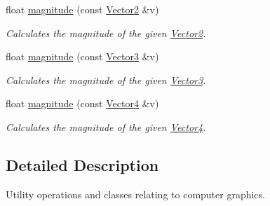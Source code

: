 \begin{DoxyCompactItemize}
\item 
\hypertarget{namespacechaos_1_1gfx_a9ba43b8cdaa6b28dfeb2c7ed6036a54b}{float \hyperlink{namespacechaos_1_1gfx_a9ba43b8cdaa6b28dfeb2c7ed6036a54b}{magnitude} (const \hyperlink{classchaos_1_1gfx_1_1_vector2}{Vector2} \&v)}\label{namespacechaos_1_1gfx_a9ba43b8cdaa6b28dfeb2c7ed6036a54b}

\begin{DoxyCompactList}\small\item\em Calculates the magnitude of the given \hyperlink{classchaos_1_1gfx_1_1_vector2}{Vector2}. \end{DoxyCompactList}\item 
\hypertarget{namespacechaos_1_1gfx_afb2d655cd9f5cd51f31f8126112689aa}{float \hyperlink{namespacechaos_1_1gfx_afb2d655cd9f5cd51f31f8126112689aa}{magnitude} (const \hyperlink{classchaos_1_1gfx_1_1_vector3}{Vector3} \&v)}\label{namespacechaos_1_1gfx_afb2d655cd9f5cd51f31f8126112689aa}

\begin{DoxyCompactList}\small\item\em Calculates the magnitude of the given \hyperlink{classchaos_1_1gfx_1_1_vector3}{Vector3}. \end{DoxyCompactList}\item 
\hypertarget{namespacechaos_1_1gfx_aecc53831b19cb7a86e0c32e6d9c148a9}{float \hyperlink{namespacechaos_1_1gfx_aecc53831b19cb7a86e0c32e6d9c148a9}{magnitude} (const \hyperlink{classchaos_1_1gfx_1_1_vector4}{Vector4} \&v)}\label{namespacechaos_1_1gfx_aecc53831b19cb7a86e0c32e6d9c148a9}

\begin{DoxyCompactList}\small\item\em Calculates the magnitude of the given \hyperlink{classchaos_1_1gfx_1_1_vector4}{Vector4}. \end{DoxyCompactList}\end{DoxyCompactItemize}


\subsection{Detailed Description}
Utility operations and classes relating to computer graphics. 